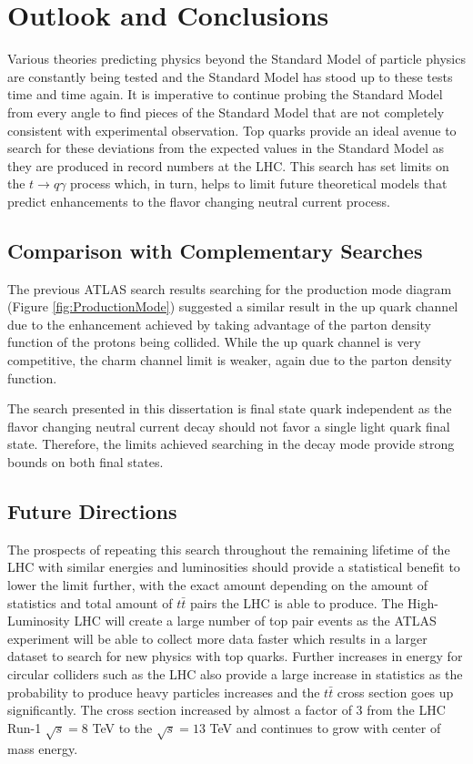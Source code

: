 
\chapter{Outlook and Conclusions}
\label{ch:Conclusion}
Various theories predicting physics beyond the Standard Model of particle physics are constantly being tested and the Standard Model has stood up to these tests time and time again.  It is imperative to continue probing the Standard Model from every angle to find pieces of the Standard Model that are not completely consistent with experimental observation.  Top quarks provide an ideal avenue to search for these deviations from the expected values in the Standard Model as they are produced in record numbers at the LHC.  This search has set limits on the $t\rightarrow q \gamma$ process which, in turn, helps to limit future theoretical models that predict enhancements to the flavor changing neutral current process.

\section{Comparison with Complementary Searches}

The previous ATLAS search results searching for the production mode diagram (Figure \ref{fig:ProductionMode})\cite{GregorFCNC} suggested a similar result in the up quark channel due to the enhancement achieved by taking advantage of the parton density function of the protons being collided.  While the up quark channel is very competitive, the charm channel limit is weaker, again due to the parton density function.  

The search presented in this dissertation is final state quark independent as the flavor changing neutral current decay should not favor a single light quark final state.  Therefore, the limits achieved searching in the decay mode provide strong bounds on both final states. 

\section{Future Directions}
The prospects of repeating this search throughout the remaining lifetime of the LHC with similar energies and luminosities should provide a statistical benefit to lower the limit further, with the exact amount depending on the amount of statistics and total amount of $t\bar{t}$ pairs the LHC is able to produce.  The High-Luminosity LHC will create a large number of top pair events as the ATLAS experiment will be able to collect more data faster which results in a larger dataset to search for new physics with top quarks.  Further increases in energy for circular colliders such as the LHC also provide a large increase in statistics as the probability to produce heavy particles increases and the $t\bar{t}$ cross section goes up significantly.  The cross section increased by almost a factor of 3 from the LHC Run-1 $\sqrt{s}=8$ TeV to the $\sqrt{s}=13$ TeV and continues to grow with center of mass energy.


